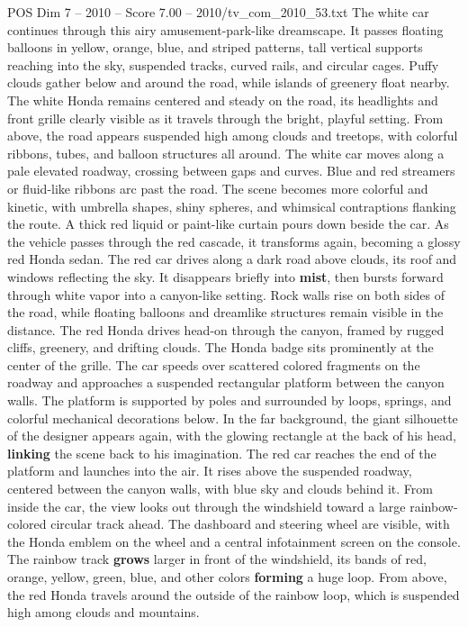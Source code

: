 \begin{textsample}{POS Dim 7 – 2010 – Score 7.00 – 2010/tv\_com\_2010\_53.txt}
The white car continues through this airy amusement-park-like dreamscape.
It passes floating balloons in yellow, orange, blue, and striped patterns, tall vertical supports reaching into the sky, suspended tracks, curved rails, and circular cages.
Puffy clouds gather below and around the road, while islands of greenery float nearby.
The white Honda remains centered and steady on the road, its headlights and front grille clearly visible as it travels through the bright, playful setting.
From above, the road appears suspended high among clouds and treetops, with colorful ribbons, tubes, and balloon structures all around.
The white car moves along a pale elevated roadway, crossing between gaps and curves.
Blue and red streamers or fluid-like ribbons arc past the road.
The scene becomes more colorful and kinetic, with umbrella shapes, shiny spheres, and whimsical contraptions flanking the route.
A thick red liquid or paint-like curtain pours down beside the car.
As the vehicle passes through the red cascade, it transforms again, becoming a glossy red Honda sedan.
The red car drives along a dark road above clouds, its roof and windows reflecting the sky.
It disappears briefly into \textbf{mist}, then bursts forward through white vapor into a canyon-like setting.
Rock walls rise on both sides of the road, while floating balloons and dreamlike structures remain visible in the distance.
The red Honda drives head-on through the canyon, framed by rugged cliffs, greenery, and drifting clouds.
The Honda badge sits prominently at the center of the grille.
The car speeds over scattered colored fragments on the roadway and approaches a suspended rectangular platform between the canyon walls.
The platform is supported by poles and surrounded by loops, springs, and colorful mechanical decorations below.
In the far background, the giant silhouette of the designer appears again, with the glowing rectangle at the back of his head, \textbf{linking} the scene back to his imagination.
The red car reaches the end of the platform and launches into the air.
It rises above the suspended roadway, centered between the canyon walls, with blue sky and clouds behind it.
From inside the car, the view looks out through the windshield toward a large rainbow-colored circular track ahead.
The dashboard and steering wheel are visible, with the Honda emblem on the wheel and a central infotainment screen on the console.
The rainbow track \textbf{grows} larger in front of the windshield, its bands of red, orange, yellow, green, blue, and other colors \textbf{forming} a huge loop.
From above, the red Honda travels around the outside of the rainbow loop, which is suspended high among clouds and mountains.

\end{textsample}
